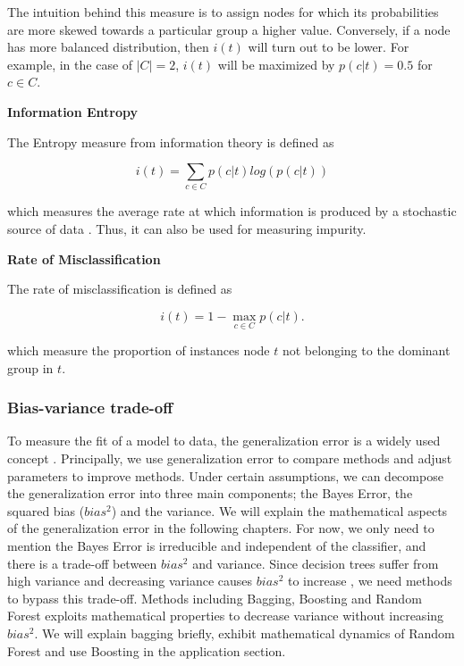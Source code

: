 The intuition behind this measure is to assign nodes for which its probabilities are more skewed towards a particular group a higher value.
Conversely, if a node has more balanced distribution, then \(i(t)\) will turn out to be lower.
For example, in the case of \( |C|=2 \), \(i(t)\) will be maximized by \( p(c|t) = 0.5 \) for \( c \in C \).


\textbf{Information Entropy}

The Entropy measure from information theory is defined as

\begin{equation}
    i(t) = \sum_{c \in C} p(c|t) log(p(c|t))
\end{equation}

which measures the average rate at which information is produced by a stochastic source of data .
Thus, it can also be used for measuring impurity.

\newpage

\textbf{Rate of Misclassification}

The rate of misclassification is defined as 

\begin{equation}
    i(t) = 1 - \max_{c \in C} p(c|t) .
\end{equation}

which measure the proportion of instances node \(t\) not belonging to the dominant group in \(t\).


\subsubsection{Bias-variance trade-off}
To measure the fit of a model to data, the generalization error is a widely used concept \cite{breiman2001random}.
Principally, we use generalization error to compare methods and adjust parameters to improve methods. 
Under certain assumptions, we can decompose the generalization error into three main components; the Bayes Error, 
the squared bias ($bias^2$) and the variance. 
We will explain the mathematical aspects of the generalization error in the following chapters. 
For now, we only need to mention the Bayes Error is irreducible and independent of the classifier, 
and there is a trade-off between $bias^2$ and variance. Since decision trees suffer from high variance and 
decreasing variance causes $bias^2$ to increase \cite{geman1992neural}, we need methods to bypass this trade-off. 
Methods including Bagging, Boosting and Random Forest exploits mathematical properties to decrease variance 
without increasing $bias^2$. We will explain bagging briefly, exhibit mathematical dynamics of Random Forest and 
use Boosting in the application section.


